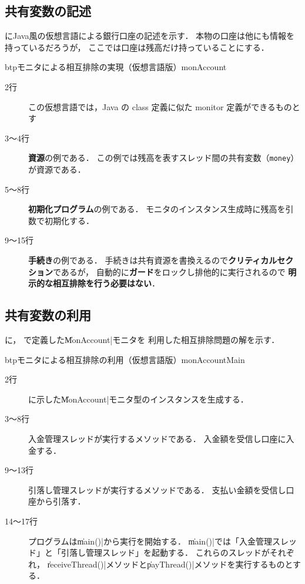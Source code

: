 \subsection{共有変数の記述}
にJava風の仮想言語による銀行口座の記述を示す．
本物の口座は他にも情報を持っているだろうが，
ここでは口座は残高だけ持っていることにする．

\begin{myfig}{btp}{モニタによる相互排除の実現（仮想言語版）}{monAccount}

\end{myfig}

\begin{description}
\item [2行]
この仮想言語では，Java の class 定義に似た monitor 定義ができるものとす

\item [3〜4行]
{\bf 資源}の例である．
この例では残高を表すスレッド間の共有変数（{\tt money}）が資源である．

\item [5〜8行]
{\bf 初期化プログラム}の例である．
モニタのインスタンス生成時に残高を引数で初期化する．

\item [9〜15行]
{\bf 手続き}の例である．
手続きは共有資源を書換えるので{\bf クリティカルセクション}であるが，
自動的に{\bf ガード}をロックし排他的に実行されるので
{\bf 明示的な相互排除を行う必要はない}．
\end{description}

\subsection{共有変数の利用}
に，
で定義した\|MonAccount|モニタを
利用した相互排除問題の解を示す．

\begin{myfig}{btp}{モニタによる相互排除の利用（仮想言語版）}{monAccountMain}

\end{myfig}

\begin{description}
\item [2行]
に示した\|MonAccount|モニタ型のインスタンスを生成する．

\item [3〜8行]
入金管理スレッドが実行するメソッドである．
入金額を受信し口座に入金する．

\item [9〜13行]
引落し管理スレッドが実行するメソッドである．
支払い金額を受信し口座から引落す．

\item [14〜17行]
プログラムは\|main()|から実行を開始する．
\|main()|では「入金管理スレッド」と「引落し管理スレッド」を起動する．
これらのスレッドがそれぞれ，
\|receiveThread()|メソッドと\|payThread()|メソッドを実行するものとする．
\end{description}

